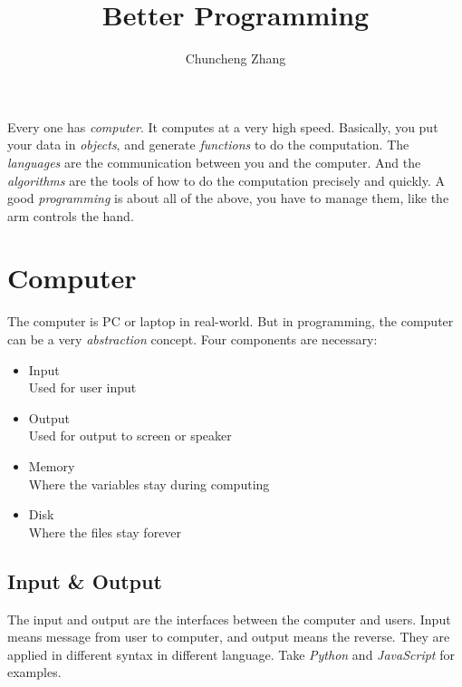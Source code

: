 

\title{Better Programming}
\author{Chuncheng Zhang}



\maketitle

\abstract
Every one has \emph{computer}.
It computes at a very high speed.
Basically, you put your data in \emph{objects}, and generate \emph{functions} to do the computation.
The \emph{languages} are the communication between you and the computer.
And the \emph{algorithms} are the tools of how to do the computation precisely and quickly.
A good \emph{programming} is about all of the above,
you have to manage them, like the arm controls the hand.

\tableofcontents

\newpage
\section{Computer}

The computer is PC or laptop in real-world.
But in programming, the computer can be a very \emph{abstraction} concept.
Four components are necessary:
\begin{itemize}
    \item Input \\ Used for user input
    \item Output \\ Used for output to screen or speaker
    \item Memory \\ Where the variables stay during computing
    \item Disk \\ Where the files stay forever
\end{itemize}

\subsection{Input \& Output}

The input and output are the interfaces between the computer and users.
Input means message from user to computer, and output means the reverse.
They are applied in different syntax in different language.
Take \emph{Python} and \emph{JavaScript} for examples.



